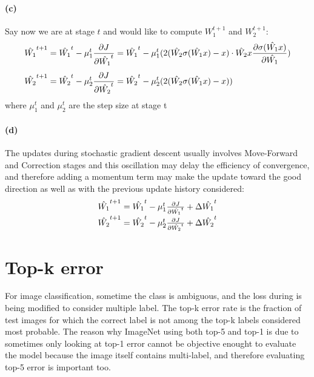 \documentclass{article}
\begin{document}
\paragraph{(c)} Say now we are at stage $t$ and would like to compute $W_1^{t+1}$ and $W_2^{t+1}$:
\begin{equation}
\begin{align}
\hat{W_1}^{t+1} &= \hat{W_1}^t - \mu_1^t {\partial J \over \partial \hat{W_1}^t} = \hat{W_1}^t - \mu_1^t( 2(\hat{W_2}\sigma(\hat{W_1}x)-x) \cdot \hat{W_2}x{\partial \sigma(\hat{W_1}x)\over \partial \hat{W_1}} ) \\[0.4em]
\hat{W_2}^{t+1} &= \hat{W_2}^t - \mu_2^t {\partial J \over \partial \hat{W_2}^t} = \hat{W_2}^t - \mu_2^t( 2(\hat{W_2}\sigma(\hat{W_1}x)-x) )
\end{align}
\end{equation}
where $\mu_1^t$ and $\mu_2^t$ are the step size at stage t

\paragraph{(d)} The updates during stochastic gradient descent usually involves Move-Forward and Correction stages and this oscillation may delay the efficiency of convergence, and therefore adding a momentum term may make the update toward the good direction as well as with the previous update history considered:
\begin{equation}
\begin{matrix}
\hat{W_1}^{t+1} = \hat{W_1}^t - \mu_1^t {\partial J \over \partial \hat{W_1}^t} + \Delta \hat{W_1}^t \\[0.4em]
\hat{W_2}^{t+1} = \hat{W_2}^t - \mu_2^t {\partial J \over \partial \hat{W_2}^t} + \Delta \hat{W_2}^t
\end{matrix}
\end{equation}

\section{Top-k error}
For image classification, sometime the class is ambiguous, and the loss during is being modified to consider multiple label. The top-k error rate is the fraction of test images for which the correct label is not among the top-k labels considered most probable. The reason why ImageNet using both top-5 and top-1 is due to sometimes only looking at top-1 error cannot be objective enought to evaluate the model because the image itself contains multi-label, and therefore evaluating top-5 error is important too.
\end{document}
